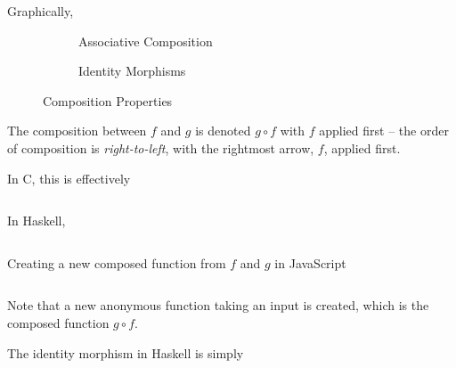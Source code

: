 \begin{definition}
    Graphically,
    \begin{figure}[H]
        \centering
        \begin{subfigure}[t]{0.45\textwidth}
            \centering
            \caption{Associative Composition}
        \end{subfigure}
        \begin{subfigure}[t]{0.45\textwidth}
            \centering
            \caption{Identity Morphisms}
        \end{subfigure}
        \caption{Composition Properties}
        \label{fig:composition-properties}
    \end{figure}
    
\end{definition}

\begin{remark}
    The composition between $f$ and $g$ is denoted $g \circ f$ with $f$ applied first -- the order of composition is \textit{right-to-left}, with the rightmost arrow, $f$, applied first.
    
    In C, this is effectively
    \inputminted{c}{content/code-listings/composition.c}
    
    In Haskell,
    \inputminted{hs}{content/code-listings/composition.hs}
    
    Creating a new composed function from $f$ and $g$ in JavaScript
    \inputminted{js}{content/code-listings/composition.js}
    
    Note that a new anonymous function taking an input  is created, which is the composed function $g \circ f$.
    
    The identity morphism in Haskell is simply
    \inputminted{hs}{content/code-listings/identity.hs}
\end{remark}
